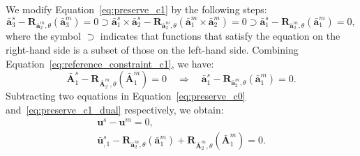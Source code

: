 We modify Equation~\eqref{eq:preserve_c1} by the following steps:
\begin{equation}
	\bar{\mathbf{a}}^s_3 - \mathbf{R}_{\bar{\mathbf{a}}^m_2,\theta}(\bar{\mathbf{a}}^m_3) = 0 \supset \bar{\mathbf{a}}^s_1 \times \bar{\mathbf{a}}^s_2 - \mathbf{R}_{\bar{\mathbf{a}}^m_2,\theta}(\bar{\mathbf{a}}^m_1 \times \bar{\mathbf{a}}^m_2) = 0\supset \bar{\mathbf{a}}^s_1 - \mathbf{R}_{\bar{\mathbf{a}}^m_2,\theta}(\bar{\mathbf{a}}^m_1) = 0,
\end{equation}
where the symbol $\supset$ indicates that functions that satisfy the equation on the right-hand side is a subset of those on the left-hand side. Combining Equation~\eqref{eq:reference_constraint_c1}, we have:
\begin{equation}
	\bar{\mathbf{A}}^s_1 - \mathbf{R}_{\bar{\mathbf{A}}^m_2,\theta}(\bar{\mathbf{A}}^m_1) = 0 \quad \Rightarrow\quad \bar{\mathbf{a}}^s_1 - \mathbf{R}_{\bar{\mathbf{a}}^m_2,\theta}(\bar{\mathbf{a}}^m_1) = 0.\label{eq:preserve_c1_dual}
\end{equation}
Subtracting two equations in Equation~\eqref{eq:preserve_c0} and~\eqref{eq:preserve_c1_dual} respectively, we obtain:
\begin{subequations}
	\begin{align}
		\mathbf{u}^s-\mathbf{u}^m=0,\label{eq:constraint_c0_kl} \\
		\bar{\mathbf{u}}^s_{,1} - \mathbf{R}_{\bar{\mathbf{a}}^m_2,\theta}(\bar{\mathbf{a}}^m_1) + \mathbf{R}_{\bar{\mathbf{A}}^m_2,\theta}(\bar{\mathbf{A}}^m_1) = 0.\label{eq:constraint_c1_kl}
	\end{align}
\end{subequations}

